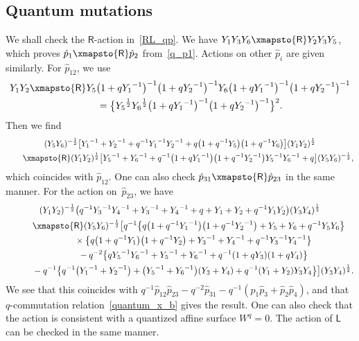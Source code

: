 \documentclass[10pt,a4paper]{amsart}
\numberwithin{equation}{section}
\begin{document}
\subsection{Quantum mutations}\label{sec:q_mutation}
We shall check the $\mathsf{R}$-action in~\eqref{RL_qp}. We have $ Y_1 Y_3 Y_6 \xmapsto{\mathsf{R}} Y_2 Y_3 Y_5$, which proves $\hat{p}_1 \xmapsto{\mathsf{R}} \hat{p}_2$ from~\eqref{q_p1}. Actions on other $\hat{p}_i$ are given similarly. For $\hat{p}_{12}$, we use
\begin{gather*}
 Y_1 Y_2 \xmapsto{\mathsf{R}} Y_5 \big( 1 + q {Y_1}^{-1} \big)^{-1} \big( 1 + q {Y_2}^{-1}\big)^{-1} Y_6 \big( 1 + q {Y_1}^{-1} \big)^{-1} \big( 1 + q {Y_2}^{-1}\big)^{-1} \\
\qquad{} = \big\{ {Y_5}^{\frac{1}{2}} {Y_6}^{\frac{1}{2}} \big( 1 + q {Y_1}^{-1} \big)^{-1} \big( 1 + q {Y_2}^{-1} \big)^{-1} \big\}^2 .
\end{gather*}
Then we find
\begin{gather*}
( Y_5 Y_6)^{-\frac{1}{2}} \big[ {Y_1}^{-1} + {Y_2}^{-1} + q^{-1} {Y_1}^{-1} {Y_2}^{-1} + q \big( 1 + q^{-1} Y_5\big)\big( 1 + q^{-1} Y_6\big)\big] ( Y_1 Y_2)^{\frac{1}{2}} \\
\qquad{} \xmapsto{\mathsf{R}} ( Y_1 Y_2)^{\frac{1}{2}} \big[ {Y_5}^{-1} + {Y_6}^{-1} + q^{-1} \big( 1+ q {Y_1}^{-1} \big) \big( 1 + q^{-1} {Y_2}^{-1} \big) {Y_5}^{-1} {Y_6}^{-1} + q \big]
( Y_5 Y_6)^{-\frac{1}{2}} ,
\end{gather*}
which coincides with $\hat{p}_{12}$. One can also check $ \hat{p}_{31} \xmapsto{\mathsf{R}} \hat{p}_{23}$ in the same manner. For the action on~$\hat{p}_{23}$, we have
\begin{gather*}
(Y_1 Y_2)^{-\frac{1}{2}}\big( q^{-1} {Y_3}^{-1} {Y_4}^{-1} + {Y_3}^{-1} + {Y_4}^{-1} + q + Y_1 + Y_2 + q^{-1} Y_1 Y_2 \big) ( Y_3 Y_4)^{\frac{1}{2}} \\
\qquad{} \xmapsto{\mathsf{R}}( Y_5 Y_6)^{-\frac{1}{2}} \big[ q^{-1} \big\{ q \big(1+ q^{-1} {Y_1}^{-1}\big)\big( 1 + q^{-1} {Y_2}^{-1}\big) + Y_5 + Y_6 + q^{-1} Y_5 Y_6\big\} \\
 \qquad\quad{} \times \big\{ q \big( 1 +q^{-1} Y_1\big) \big( 1 + q^{-1} Y_2\big) + {Y_3}^{-1} +{Y_4}^{-1} + q^{-1} {Y_3}^{-1} {Y_4}^{-1} \big\} \\
\qquad\quad {} - q^{-2} \big\{ q {Y_5}^{-1} {Y_6}^{-1} + {Y_5}^{-1} + {Y_6}^{-1}+ q^{-1} ( 1 + q Y_3 ) ( 1 + q Y_4 ) \big\} \\
\qquad\quad {} -q^{-1} \big\{ q^{-1} \big( {Y_1}^{-1} + {Y_2}^{-1} \big) + \big( {Y_5}^{-1} + {Y_6}^{-1}\big) ( Y_3 + Y_4 ) + q^{-1} ( Y_1 + Y_2 ) Y_3 Y_4 \big\}\big]( Y_3 Y_4)^{\frac{1}{2}} .
 \end{gather*}
We see that this coincides with $q^{-1} \hat{p}_{12} \hat{p}_{23}-q^{-2} \hat{p}_{31}- q^{-1} ( \hat{p}_1 \hat{p}_3 + \hat{p}_2 \hat{p}_4 ) $, and that $q$-commutation relation~\eqref{quantum_x_b} gives the result. One can also check that the action is consistent with a quantized affine surface $W^q=0$. The action of $\mathsf{L}$ can be checked in the same manner.
\end{document}
